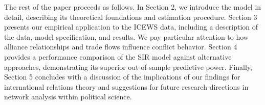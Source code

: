 The rest of the paper proceeds as follows. In Section 2, we introduce the model in detail, describing its theoretical foundations and estimation procedure. Section 3 presents our empirical application to the ICEWS data, including a description of the data, model specification, and results. We pay particular attention to how alliance relationships and trade flows influence conflict behavior. Section 4 provides a performance comparison of the SIR model against alternative approaches, demonstrating its superior out-of-sample predictive power. Finally, Section 5 concludes with a discussion of the implications of our findings for international relations theory and suggestions for future research directions in network analysis within political science.
